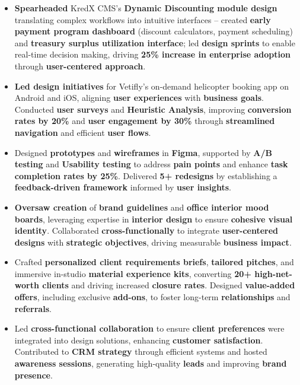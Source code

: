 \documentclass[10pt,a4paper,ragged2e,withhyper]{altacv}
\begin{document}
\begin{paracol}{2}
\begin{itemize}
  \item \textbf{Spearheaded} KredX CMS's \textbf{Dynamic Discounting module design} translating complex workflows into intuitive interfaces – created \textbf{early payment program dashboard} (discount calculators, payment scheduling) and \textbf{treasury surplus utilization interface}; led \textbf{design sprints} to enable real-time decision making, driving \textbf{25\% increase in enterprise adoption} through \textbf{user-centered approach}.
\end{itemize}

\divider

\begin{itemize}
  \item \textbf{Led design initiatives} for Vetifly’s on-demand helicopter booking app on Android and iOS, aligning \textbf{user experiences} with \textbf{business goals}. Conducted \textbf{user surveys} and \textbf{Heuristic Analysis}, improving \textbf{conversion rates by 20\%} and \textbf{user engagement by 30\%} through \textbf{streamlined navigation} and efficient \textbf{user flows}.
  \item Designed \textbf{prototypes} and \textbf{wireframes} in \textbf{Figma}, supported by \textbf{A/B testing} and \textbf{Usability testing} to address \textbf{pain points} and enhance \textbf{task completion rates by 25\%}. Delivered \textbf{5+ redesigns} by establishing a \textbf{feedback-driven framework} informed by \textbf{user insights}.
  \item \textbf{Oversaw creation} of \textbf{brand guidelines} and \textbf{office interior mood boards}, leveraging expertise in \textbf{interior design} to ensure \textbf{cohesive visual identity}. Collaborated \textbf{cross-functionally} to integrate \textbf{user-centered designs} with \textbf{strategic objectives}, driving measurable \textbf{business impact}.
\end{itemize}

\divider

\begin{itemize}
  \item Crafted \textbf{personalized client requirements briefs}, \textbf{tailored pitches}, and immersive in-studio \textbf{material experience kits}, converting \textbf{20+ high-net-worth clients} and driving increased \textbf{closure rates}. Designed \textbf{value-added offers}, including exclusive \textbf{add-ons}, to foster long-term \textbf{relationships} and \textbf{referrals}.
  \item Led \textbf{cross-functional collaboration} to ensure \textbf{client preferences} were integrated into design solutions, enhancing \textbf{customer satisfaction}. Contributed to \textbf{CRM strategy} through efficient systems and hosted \textbf{awareness sessions}, generating high-quality \textbf{leads} and improving \textbf{brand presence}.
\end{itemize}


\end{paracol}
\end{document}
